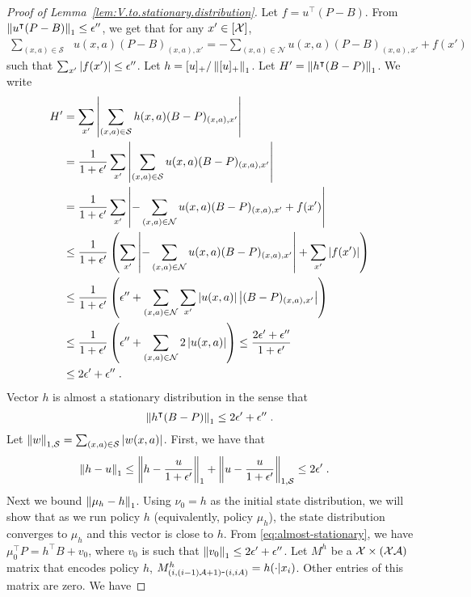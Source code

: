 \documentclass[11pt]{article}
\begin{document}
\begin{proof}[Proof of Lemma~\ref{lem:V.to.stationary.distribution}]
Let $f = u^\top (P-B)$. From $\left\Vert u^\intercal (P-B)\right\Vert_1 \le \epsilon''$, we get that for any $x'\in [{\cal X}]$,
\begin{align*}
\sum_{(x,a)\in \mathcal S} & u(x,a) (P-B)_{(x,a), x'} = - \sum_{(x,a)\in \mathcal N} u(x,a) (P-B)_{(x,a), x'} + f(x')
\end{align*}
such that $\sum_{x'} \left\vert f(x')\right\vert \le \epsilon''$. Let $h = [u]_+/\left\Vert[u]_+\right\Vert_1$. Let $H' = \left\Vert h^\intercal (B-P)\right\Vert_1$. We write
\begin{align*}
H' &= \sum_{x'} \left\vert\sum_{(x,a)\in \mathcal S} h(x,a)  (B-P)_{(x,a),x'} \right\vert \\
&=  \frac{1}{1+\epsilon'} \sum_{x'} \left\vert\sum_{(x,a)\in \mathcal S} u(x,a)  (B-P)_{(x,a),x'} \right\vert \\
&= \frac{1}{1+\epsilon'}  \sum_{x'} \left\vert-\sum_{(x,a)\in \mathcal N} u(x,a) (B-P)_{(x,a),x'} + f(x')\right\vert \\
&\le \frac{1}{1+\epsilon'} \left( \sum_{x'} \left\vert-\sum_{(x,a)\in \mathcal N} u(x,a) (B-P)_{(x,a),x'}\right\vert + \sum_{x'} \left\vert f(x')\right\vert \right) \\
&\le \frac{1}{1+\epsilon'} \left( \epsilon'' + \sum_{(x,a)\in \mathcal N} \sum_{x'} \left\vert u(x,a)\right\vert \left\vert(B-P)_{(x,a),x'}\right\vert \right)  \\
&\le \frac{1}{1+\epsilon'} \left( \epsilon'' + \sum_{(x,a)\in \mathcal N} 2 \left\vert u(x,a)\right\vert \right) \le \frac{2\epsilon' + \epsilon''}{1+\epsilon'} \\
&\le 2 \epsilon' + \epsilon''  \; .
\end{align*}
Vector $h$ is almost a stationary distribution in the sense that
\begin{equation}
\label{eq:almost-stationary}
\left\Vert h^\intercal (B-P)\right\Vert_1 \le 2 \epsilon' + \epsilon''\; .
\end{equation}
Let $\left\Vert w\right\Vert_{1,\mathcal S} = \sum_{(x,a)\in \mathcal S} \left\vert w(x,a)\right\vert$. First, we have that
\begin{align*}
\left\Vert h - u\right\Vert_1 &\le \left\Vert h - \frac{u}{1+\epsilon'}\right\Vert_1 + \left\Vert u - \frac{u}{1+\epsilon'}\right\Vert_{1,\mathcal S} \le 2 \epsilon' \; .
\end{align*}
Next we bound $\left\Vert \mu_{h} - h\right\Vert_1$. Using $\nu_0 = h$ as the initial state distribution, we will show that as we run policy $h$ (equivalently, policy $ \mu_{h}$), the state distribution converges to $ \mu_{h}$ and this vector is close to $h$. From \eqref{eq:almost-stationary}, we have $\mu_0^\top P = h^\top B + v_0$, where $v_0$ is such that $\left\Vert v_0\right\Vert_1\le 2\epsilon'+\epsilon''$. Let $M^{h}$ be a ${\cal X}\times ({\cal X}{\cal A})$ matrix that encodes policy $h$, $M_{(i,(i-1){\cal A}+1)\mbox{-}(i,iA)}^{h}=h(\cdot|x_i)$. Other entries of this matrix are zero. We have

\end{proof}
\end{document}
